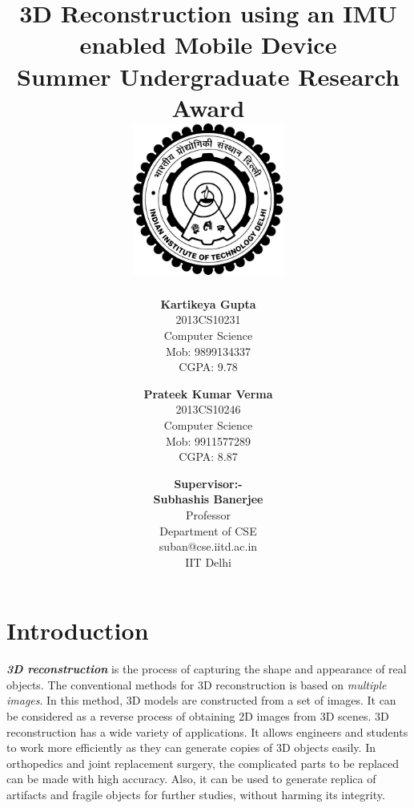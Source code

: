 \documentclass{article}
\title{\vspace*{\fill} \textbf{3D Reconstruction using an IMU enabled Mobile Device}
	  \\ {\large \textbf{Summer Undergraduate Research Award}}
	  \\  \vspace{3mm} \includegraphics[width=5cm]{logo.png}}
\author{
	\textbf{Kartikeya Gupta}\\ 
	2013CS10231\\
	Computer Science\\
	Mob: 9899134337\\
	CGPA: 9.78
	\and
	\textbf{Prateek Kumar Verma}\\ 
	2013CS10246\\
	Computer Science\\
	Mob: 9911577289\\
	CGPA: 8.87
}
\date{\textbf{Supervisor:-} \\ \textbf{Subhashis Banerjee} \\ Professor \\ Department of CSE \\ suban@cse.iitd.ac.in\\ IIT Delhi\\ 
\noindent \namesigdate{} 
\vspace*{\fill}}
\begin{document}
	\maketitle

	\newpage
	
	\section{Introduction}
		\textit{\textbf{3D reconstruction}} is the process of capturing the shape and appearance of real objects. The conventional methods for 3D reconstruction is based on \textit{multiple images}. In this method, 3D models are constructed from a set of images. It can be considered as a reverse process of obtaining 2D images from 3D scenes.
		\newline
		3D reconstruction has a wide variety of applications. It allows engineers and students to work more efficiently as they can generate copies of 3D objects easily. In orthopedics and joint replacement surgery, the complicated parts to be replaced can be made with high accuracy. Also, it can be used to generate replica of artifacts and fragile objects for further studies, without harming its integrity.
\end{document}
